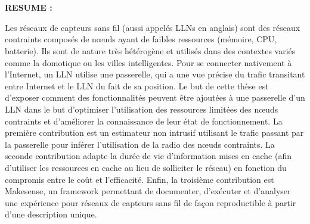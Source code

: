 


\pagestyle{empty}

\AddToShipoutPicture*{\BackgroundPicLastPage}

\vspace{1.5cm}


\begin{center}{\LARGE \textbf{\myTitle}}\\
\vspace{.4cm}
{\large \textbf{\myName}}\\
\end{center}

\vspace{.9cm}

\textbf{RESUME :}

Les réseaux de capteurs sans fil (aussi appelés \ac{LLN}s en anglais) sont des réseaux contraints composés de nœuds ayant de faibles ressources (mémoire, CPU, batterie).
Ils sont de nature très hétérogène et utilisés dans des contextes variés comme la domotique ou les villes intelligentes.
Pour se connecter nativement à l'Internet, un \ac{LLN} utilise une passerelle, qui a une vue précise du trafic transitant entre Internet et le \ac{LLN} du fait de sa position.
Le but de cette thèse est d'exposer comment des fonctionnalités peuvent être ajoutées à une passerelle d'un \ac{LLN} dans le but d'optimiser l'utilisation des ressources limitées des nœuds contraints et d'améliorer la connaissance de leur état de fonctionnement.
La première contribution est un estimateur non intrusif utilisant le trafic passant par la passerelle pour inférer l'utilisation de la radio des nœuds contraints.
La seconde contribution adapte la durée de vie d’information mises en cache (afin d’utiliser les ressources en cache au lieu de solliciter le réseau) en fonction du compromis entre le coût et l'efficacité.
Enfin, la troisième contribution est Makesense, un framework permettant de documenter, d’exécuter et d’analyser une expérience pour réseaux de capteurs sans fil de façon reproductible à partir d'une description unique.


\vspace{.6cm}


